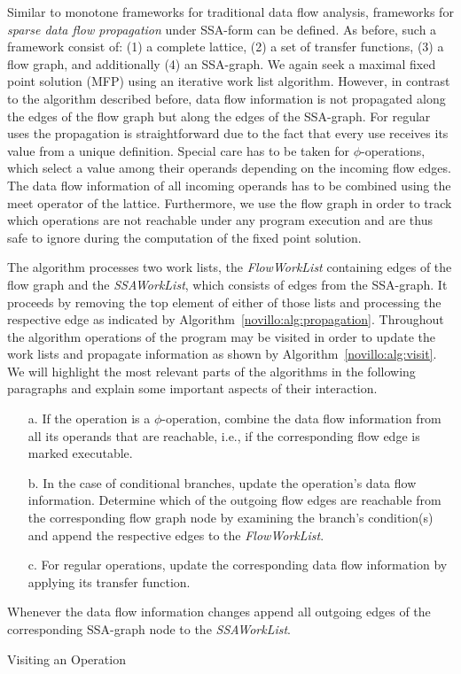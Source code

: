 Similar to monotone frameworks for traditional data flow analysis, frameworks
for \emph{sparse data flow propagation} under SSA-form can be defined. As
before, such a framework consist of: (1) a complete lattice, (2) a set of
transfer functions, (3) a flow graph, and additionally (4) an SSA-graph. We
again seek a maximal fixed point solution (MFP) using an iterative work list
algorithm. However, in contrast to the algorithm described before, data flow
information is not propagated along the edges of the flow graph but along the
edges of the SSA-graph. For regular uses the propagation is straightforward due
to the fact that every use receives its value from a unique definition. Special
care has to be taken for $\phi$-operations, which select a value among their
operands depending on the incoming flow edges. The data flow information of all
incoming operands has to be combined using the meet operator of the lattice.
Furthermore, we use the flow graph in order to track which operations are not
reachable under any program execution and are thus safe to ignore during the
computation of the fixed point solution.

The algorithm processes two work lists, the \emph{FlowWorkList} containing edges
of the flow graph and the \emph{SSAWorkList}, which consists of edges from the
SSA-graph. It proceeds by removing the top element of either of those lists and
processing the respective edge as indicated by
Algorithm~\ref{novillo:alg:propagation}. Throughout the algorithm operations of
the program may be visited in order to update the work lists and propagate
information as shown by Algorithm~\ref{novillo:alg:visit}. We will highlight
the most relevant parts of the algorithms in the following paragraphs and
explain some important aspects of their interaction.

\begin{algorithm}[t!]
  \begin{enumerate}
    \item[a.] \label{novillo:alg:visit:phi} If the operation is a
              $\phi$-operation, combine the data flow information from all its
              operands that are reachable, i.e., if the corresponding flow edge
              is marked executable.
    \item[b.] \label{novillo:alg:visit:branch} In the case of conditional
              branches, update the operation's data flow information. Determine
              which of the outgoing flow edges are reachable from the
              corresponding flow graph node by examining the branch's
              condition(s) and append the respective edges to the
              \emph{FlowWorkList}.
    \item[c.] \label{novillo:alg:visit:regular} For regular operations, update
              the corresponding data flow information by applying its transfer
              function.
    \vspace{-1em}
  \end{enumerate}
  Whenever the data flow information changes append all outgoing edges of the
  corresponding SSA-graph node to the \emph{SSAWorkList}.
  \caption{Visiting an Operation}
  \label{novillo:alg:visit}
\end{algorithm}

